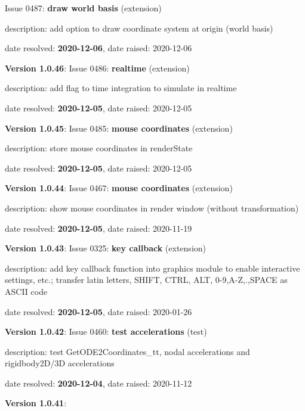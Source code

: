   Issue 0487: {\bf draw world basis}
(extension)
  \bi
  \item {\small description: add option to draw coordinate system at origin (world basis)}
  \item   date resolved: {\bf 2020-12-06},
date raised: 2020-12-06   \ei
  \item {\bf Version 1.0.46}: \vspace{-6pt} 
  Issue 0486: {\bf realtime}
(extension)
  \bi
  \item {\small description: add flag to time integration to simulate in realtime}
  \item   date resolved: {\bf 2020-12-05},
date raised: 2020-12-05   \ei
  \item {\bf Version 1.0.45}: \vspace{-6pt} 
  Issue 0485: {\bf mouse coordinates}
(extension)
  \bi
  \item {\small description: store mouse coordinates in renderState}
  \item   date resolved: {\bf 2020-12-05},
date raised: 2020-12-05   \ei
  \item {\bf Version 1.0.44}: \vspace{-6pt} 
  Issue 0467: {\bf mouse coordinates}
(extension)
  \bi
  \item {\small description: show mouse coordinates in render window (without transformation)}
  \item   date resolved: {\bf 2020-12-05},
date raised: 2020-11-19   \ei
  \item {\bf Version 1.0.43}: \vspace{-6pt} 
  Issue 0325: {\bf key callback}
(extension)
  \bi
  \item {\small description: add key callback function into graphics module to enable interactive settings, etc.; transfer latin letters, SHIFT, CTRL, ALT, 0-9,A-Z,.,SPACE as ASCII code}
  \item   date resolved: {\bf 2020-12-05},
date raised: 2020-01-26   \ei
  \item {\bf Version 1.0.42}: \vspace{-6pt} 
  Issue 0460: {\bf test accelerations}
(test)
  \bi
  \item {\small description: test GetODE2Coordinates\_tt, nodal accelerations and rigidbody2D/3D accelerations}
  \item   date resolved: {\bf 2020-12-04},
date raised: 2020-11-12   \ei
  \item {\bf Version 1.0.41}: \vspace{-6pt} 
